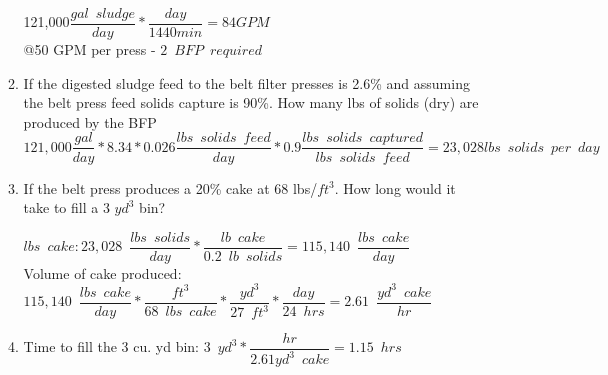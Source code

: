 \begin{enumerate}
\begin{enumerate}
121,000$\dfrac{gal \enspace sludge}{day}*\dfrac{day}{1440min}=84 GPM$\\
@50 GPM per press - $\boxed{2 \enspace BFP \enspace required}$

\item If the digested sludge feed to the belt filter presses is 2.6\% and assuming the belt press feed solids capture is 90\%.  How many lbs of solids (dry) are produced by the BFP \\
$121,000\dfrac{gal}{day}*8.34*0.026\dfrac{lbs \enspace solids \enspace feed}{day}*0.9\dfrac{lbs \enspace solids \enspace captured}{lbs \enspace solids \enspace feed}=\boxed{23,028 lbs \enspace solids \enspace per \enspace day}$

\item If the belt press produces a 20\% cake at 68 lbs/$ft^3$.  How long would it take to fill a 3 $yd^3$ bin?
\vspace{0.3cm}

$lbs \enspace cake: 23,028 \enspace \dfrac{lbs \enspace solids}{day}*\dfrac{lb \enspace cake}{0.2 \enspace lb \enspace solids}=115,140 \enspace \dfrac{lbs \enspace cake}{day}$\\

\vspace{0.3cm}
Volume of cake produced: $115,140 \enspace \dfrac{lbs \enspace cake}{day}*\dfrac{ft^3}{68 \enspace lbs \enspace cake}*\dfrac{yd^3}{27 \enspace ft^3}*\dfrac{day}{24 \enspace hrs} =2.61 \enspace \dfrac{yd^3 \enspace cake}{hr}$
\item Time to fill the 3 cu. yd bin: $3 \enspace yd^3 *\dfrac{hr}{2.61 yd^3 \enspace cake}=\boxed{1.15 \enspace hrs}$

 
\end{enumerate}


\end{enumerate}
